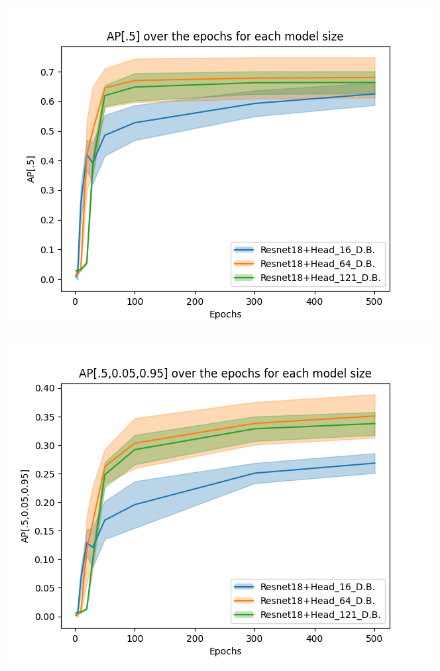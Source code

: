 \begin{figure}[!htbp]
    \centering
    \begin{minipage}[t]{.5\textwidth}%
      \centering
      \includegraphics[width=1.1\linewidth]{Figures/results/resnet18+head/resnet18+head_ap05_4_nb_db.png}
      \label{fig:resnet18+head_ap05_4_nb_db}
    \end{minipage}%
    \begin{minipage}[t]{.5\textwidth}%
      \centering
      \includegraphics[width=1.1\linewidth ]{Figures/results/resnet18+head/resnet18+head_ap05_95_4_nb_db.png}
      \label{fig:resnet18+head_ap05_095_4_nb_db}
    \end{minipage}
\end{figure}


